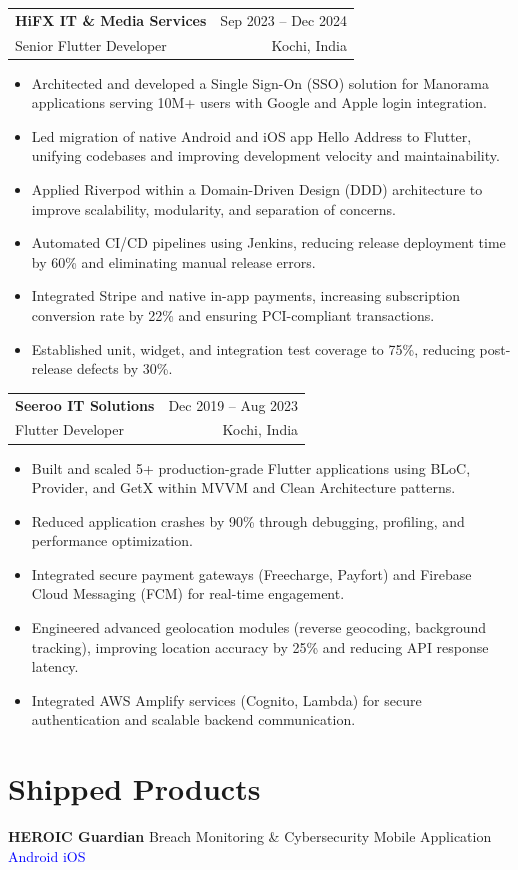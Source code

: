 \documentclass[letterpaper,10pt]{article}
\makeatletter
\newcommand{\role}[4]{
  \vspace{2pt}
  \noindent\begin{tabular*}{\textwidth}{l@{\extracolsep{\fill}}r}
    \textbf{#1} & #2 \\
    #3 & #4 \\
  \end{tabular*}
  \vspace{-6pt}
}
\newcommand{\project}[2]{
  \noindent\textbf{#1} \hspace{2pt}\textemdash\hspace{2pt} #2
  \vspace{1pt}
}
\makeatother
\begin{document}
\role{HiFX IT \& Media Services}{Sep 2023 -- Dec 2024}{Senior Flutter Developer}{Kochi, India}
\begin{itemize}
  \item Architected and developed a Single Sign-On (SSO) solution for Manorama applications serving 10M+ users with Google and Apple login integration.
  \item Led migration of native Android and iOS app Hello Address to Flutter, unifying codebases and improving development velocity and maintainability.
  \item Applied Riverpod within a Domain-Driven Design (DDD) architecture to improve scalability, modularity, and separation of concerns.
  \item Automated CI/CD pipelines using Jenkins, reducing release deployment time by 60\% and eliminating manual release errors.
  \item Integrated Stripe and native in-app payments, increasing subscription conversion rate by 22\% and ensuring PCI-compliant transactions.
  \item Established unit, widget, and integration test coverage to 75\%, reducing post-release defects by 30\%.
\end{itemize}

\role{Seeroo IT Solutions}{Dec 2019 -- Aug 2023}{Flutter Developer}{Kochi, India}
\begin{itemize}
  \item Built and scaled 5+ production-grade Flutter applications using BLoC, Provider, and GetX within MVVM and Clean Architecture patterns.
  \item Reduced application crashes by 90\% through debugging, profiling, and performance optimization.
  \item Integrated secure payment gateways (Freecharge, Payfort) and Firebase Cloud Messaging (FCM) for real-time engagement.
  \item Engineered advanced geolocation modules (reverse geocoding, background tracking), improving location accuracy by 25\% and reducing API response latency.
  \item Integrated AWS Amplify services (Cognito, Lambda) for secure authentication and scalable backend communication.
\end{itemize}

\section*{Shipped Products}
\vspace{2pt}
\project{HEROIC Guardian}{Breach Monitoring \& Cybersecurity Mobile Application \quad \textcolor{blue}{Android} \quad \textcolor{blue}{iOS}}
\end{document}
